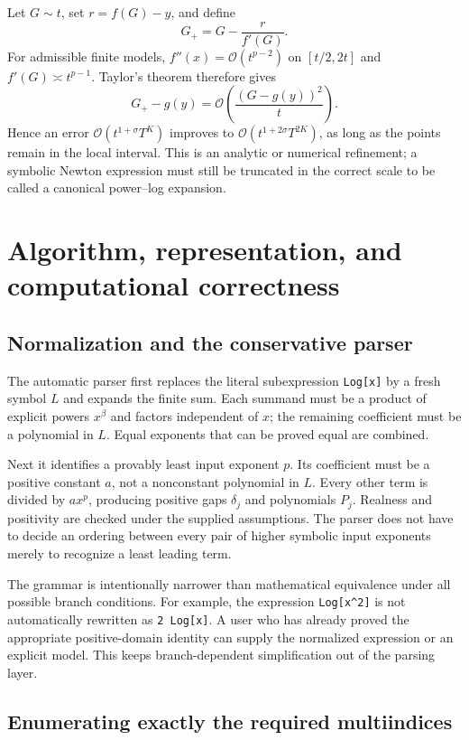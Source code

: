 \documentclass[11pt,a4paper]{article}
\theoremstyle{definition}
\theoremstyle{remark}
\newcommand{\OO}{\mathcal O}
\newcommand{\code}[1]{\texttt{#1}}
\begin{document}
Let $G\sim t$, set $r=f(G)-y$, and define
\[
 G_+=G-\frac{r}{f'(G)}.
\]
For admissible finite models, $f''(x)=\OO(t^{p-2})$ on $[t/2,2t]$ and
$f'(G)\asymp t^{p-1}$. Taylor's theorem therefore gives
\[
 G_+-g(y)=\OO\left(\frac{(G-g(y))^2}{t}\right).
\]
Hence an error $\OO(t^{1+\sigma}T^K)$ improves to
$\OO(t^{1+2\sigma}T^{2K})$, as long as the points remain in the local interval.
This is an analytic or numerical refinement; a symbolic Newton expression
must still be truncated in the correct scale to be called a canonical
power--log expansion.

\section{Algorithm, representation, and computational correctness}
\label{sec:algorithm}

\subsection{Normalization and the conservative parser}

The automatic parser first replaces the literal subexpression
\code{Log[x]} by a fresh symbol $L$ and expands the finite sum. Each summand
must be a product of explicit powers $x^\beta$ and factors independent of $x$;
the remaining coefficient must be a polynomial in $L$. Equal exponents that
can be proved equal are combined.

Next it identifies a provably least input exponent $p$. Its coefficient must
be a positive constant $a$, not a nonconstant polynomial in $L$. Every other
term is divided by $ax^p$, producing positive gaps $\delta_j$ and polynomials
$P_j$. Realness and positivity are checked under the supplied assumptions.
The parser does not have to decide an ordering between every pair of higher
symbolic input exponents merely to recognize a least leading term.

The grammar is intentionally narrower than mathematical equivalence under all
possible branch conditions. For example, the expression \code{Log[x\^{}2]}
is not automatically rewritten as \code{2 Log[x]}. A user who has already
proved the appropriate positive-domain identity can supply the normalized
expression or an explicit model. This keeps branch-dependent simplification
out of the parsing layer.

\subsection{Enumerating exactly the required multiindices}
\end{document}
